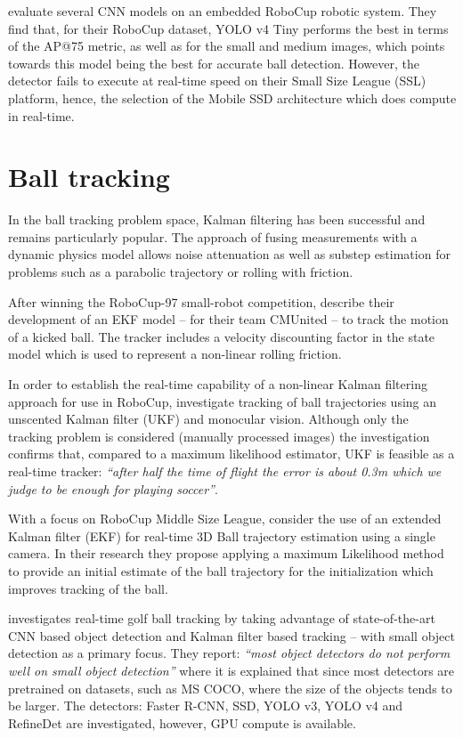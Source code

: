 \documentclass[a4paper,twoside,12pt]{report}
\begin{document}
\cite{robocupdataset} evaluate several CNN models on an embedded RoboCup robotic system. They find that, for their RoboCup dataset, YOLO v4 Tiny performs the best in terms of the AP@75 metric, as well as for the small and medium images, which points towards this model being the best for accurate ball detection. However, the detector fails to execute at real-time speed on their Small Size League (SSL) platform, hence, the selection of the Mobile SSD architecture which does compute in real-time.

\section{Ball tracking}
\label{section:balltracking}

In the ball tracking problem space, Kalman filtering has been successful and remains particularly popular. The approach of fusing measurements with a dynamic physics model allows noise attenuation as well as substep estimation for problems such as a parabolic trajectory or rolling with friction.

After winning the RoboCup-97 small-robot competition, \cite{kalmanmodel} describe their development of an EKF model -- for their team CMUnited -- to track the motion of a kicked ball. The tracker includes a velocity discounting factor in the state model which is used to represent a non-linear rolling friction. 

In order to establish the real-time capability of a non-linear Kalman filtering approach for use in RoboCup, \cite{robocuptrack} investigate tracking of ball trajectories using an unscented Kalman filter (UKF) and monocular vision. Although only the tracking problem is considered (manually processed images) the investigation confirms that, compared to a maximum likelihood estimator, UKF is feasible as a real-time tracker: \textit{``after half the time of flight the error is about 0.3m which we judge to be enough for playing soccer''}.

With a focus on RoboCup Middle Size League, \cite{3dparabola} consider the use of an extended Kalman filter (EKF) for real-time 3D Ball trajectory estimation using a single camera. In their research they propose applying a maximum Likelihood method to provide an initial estimate of the ball trajectory for the initialization which improves tracking of the ball.

\cite{golftrack} investigates real-time golf ball tracking by taking advantage of state-of-the-art CNN based object detection and Kalman filter based tracking -- with small object detection as a primary focus. They report: \textit{``most object detectors do not perform well on small object detection''} where it is explained that since most detectors are pretrained on datasets, such as MS COCO, where the size of the objects tends to be larger. The detectors: Faster R-CNN, SSD, YOLO v3, YOLO v4 and RefineDet are investigated, however, GPU compute is available. 
\end{document}
